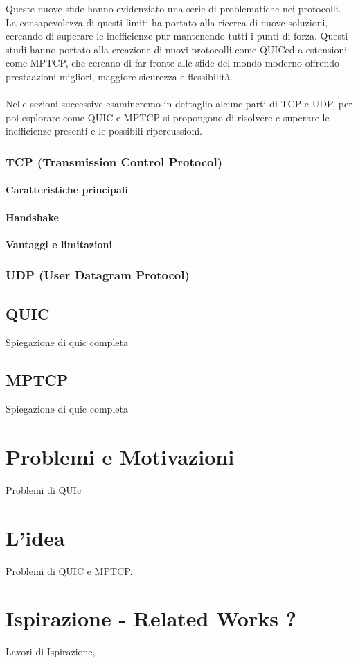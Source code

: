Queste nuove sfide hanno evidenziato una serie di problematiche nei protocolli. La consapevolezza di questi limiti ha portato alla ricerca di nuove soluzioni, cercando di superare le inefficienze pur mantenendo tutti i punti di forza.
Questi studi hanno portato alla creazione di nuovi protocolli come QUIC\glsfirstoccur ed a estensioni come MPTCP\glsfirstoccur, che cercano di far fronte alle sfide del mondo moderno offrendo prestaazioni migliori, maggiore sicurezza e flessibilità.
\\
\\
Nelle sezioni successive esamineremo in dettaglio alcune parti di TCP e UDP, per poi esplorare come QUIC e MPTCP si propongono di risolvere e superare le inefficienze presenti e le possibili ripercussioni.

\subsubsection{TCP (Transmission Control Protocol)}

\paragraph{ Caratteristiche principali}
\paragraph{ Handshake }
\paragraph{ Vantaggi e limitazioni}

\subsubsection{UDP (User Datagram Protocol)}

\subsection{QUIC}

Spiegazione di quic completa

\subsection{MPTCP}

Spiegazione di quic completa

\section{Problemi e Motivazioni}

Problemi di QUIc 

\section{L'idea}

Problemi di QUIC e MPTCP. 

\section{Ispirazione - Related Works ?}

Lavori di Ispirazione, 
